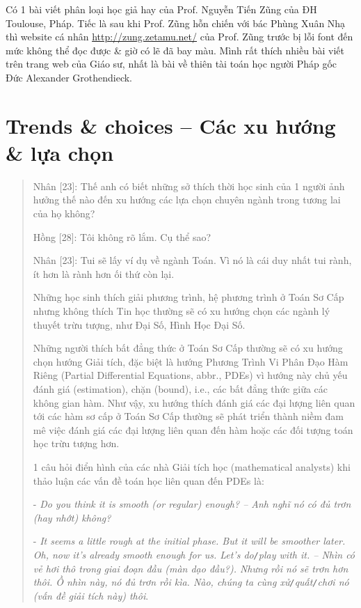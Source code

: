 \documentclass[12pt,oneside]{book}
\begin{document}
Có 1 bài viết phân loại học giả hay của Prof. {\sc Nguyễn Tiến Zũng} của ĐH Toulouse, Pháp. Tiếc là sau khi Prof. Zũng hỗn chiến với bác  Phùng Xuân Nhạ thì website cá nhân \url{http://zung.zetamu.net/} của Prof. {\sc Zũng} trước bị lỗi font đến mức không thể đọc được \& giờ có lẽ đã bay màu. Mình rất thích nhiều bài viết trên trang web của Giáo sư, nhất là bài về thiên tài toán học người Pháp gốc Đức {\sc Alexander Grothendieck}.

\section{Trends \& choices -- Các xu hướng \& lựa chọn}	

\begin{quote}
	{\sf Nhân [23]}: Thế anh có biết những sở thích thời học sinh của 1 người ảnh hưởng thế nào đến xu hướng các lựa chọn chuyên ngành trong tương lai của họ không?
	
	{\sf Hồng [28]}: Tôi không rõ lắm. Cụ thể sao?
	
	{\sf Nhân [23]}: Tui sẽ lấy ví dụ về ngành Toán. Vì nó là cái duy nhất tui rành, ít hơn là rành hơn ối thứ còn lại.
	
	Những học sinh thích giải phương trình, hệ phương trình ở Toán Sơ Cấp nhưng không thích Tin học thường sẽ có xu hướng chọn các ngành lý thuyết trừu tượng, như Đại Số, Hình Học Đại Số. 
	
	Những người thích bất đẳng thức ở Toán Sơ Cấp thường sẽ có xu hướng chọn hướng Giải tích, đặc biệt là hướng Phương Trình Vi Phân Đạo Hàm Riêng (Partial Differential Equations, abbr., PDEs) vì hướng này chủ yếu đánh giá (estimation), chặn (bound), i.e., các bất đẳng thức giữa các không gian hàm. Như vậy, xu hướng thích đánh giá các đại lượng liên quan tới các hàm sơ cấp ở Toán Sơ Cấp thường sẽ phát triển thành niềm đam mê việc đánh giá các đại lượng liên quan đến hàm hoặc các đối tượng toán học trừu tượng hơn.

	1 câu hỏi điển hình của các nhà Giải tích học (mathematical analysts) khi thảo luận các vấn đề toán học liên quan đến PDEs là:
	
	- {\it Do you think it is smooth (or regular) enough? -- Anh nghĩ nó có đủ trơn (hay nhớt) không?}
	
	- {\it It seems a little rough at the initial phase. But it will be smoother later. Oh, now it's already smooth enough for us. Let's do{\tt/}play with it. -- Nhìn có vẻ hơi thô trong giai đoạn đầu (màn dạo đầu?). Nhưng rồi nó sẽ trơn hơn thôi. Ồ nhìn này, nó đủ trơn rồi kìa. Nào, chúng ta cùng xử{\tt/}quất{\tt/}chơi nó (vấn đề giải tích này) thôi}.
	

\end{quote}
\end{document}
